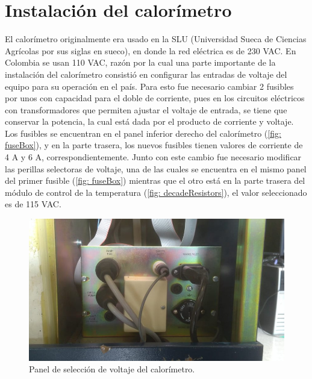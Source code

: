 \chapter{Instalación del calorímetro}
	El calorímetro originalmente era usado en la SLU (Universidad Sueca de Ciencias Agrícolas por sus siglas en sueco), en donde la red eléctrica es de 230 VAC. En Colombia se usan 110 VAC, razón por la cual una parte importante de la instalación del calorímetro consistió en configurar las entradas de voltaje del equipo para su operación en el país. Para esto fue necesario cambiar 2 fusibles por unos con capacidad para el doble de corriente, pues en los circuitos eléctricos con transformadores que permiten ajustar el voltaje de entrada, se tiene que conservar la potencia, la cual está dada por el producto de corriente y voltaje. Los fusibles se encuentran en el panel inferior derecho del calorímetro (\autoref{fig: fuseBox}), y en la parte trasera, los nuevos fusibles tienen valores de corriente de 4 A y 6 A, correspondientemente. Junto con este cambio fue necesario modificar las perillas selectoras de voltaje, una de las cuales se encuentra en el mismo panel del primer fusible (\autoref{fig: fuseBox}) mientras que el otro está en la parte trasera del módulo de control de la temperatura (\autoref{fig: decadeResistors}), el valor seleccionado es de 115 VAC.
	\begin{figure}[h]
		\centering
		\includegraphics[width=0.7\linewidth]{Figures/fusepanel}
		\caption{Panel de selección de voltaje del calorímetro.}
		\label{fig: fuseBox}
	\end{figure}

